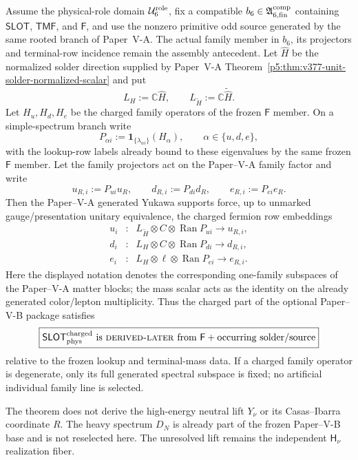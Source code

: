 \documentclass[12pt,a4paper]{article}
\newcommand{\Hnu}{\mathsf{H}_{\nu}}
\newcommand{\Urole}{\mathcal U_6^{\rm role}}
\newcommand{\Acompsix}{\mathfrak A_{6,{\rm fin}}^{\rm comp}}
\begin{document}
\begin{theorem}
\label{p7v2:thm:charged-slot-physical-later}
Assume the physical-role domain \(\Urole\), fix a compatible
\(b_6\in\Acompsix\) containing \(\mathsf{SLOT}\), \(\mathsf{TMF}\), and
\(\mathsf F\), and use the nonzero primitive odd source generated by the same rooted branch of Paper~V-A.  The actual family member in \(b_6\), its projectors and terminal-row incidence remain the assembly antecedent.  Let \(\widehat H\) be the normalized solder direction supplied by Paper~V-A Theorem~\ref{p5:thm:v377-unit-solder-normalized-scalar} and put
\[
 L_H:=\mathbb C\widehat H,
 \qquad
 L_{\widetilde H}:=\mathbb C\widetilde{\widehat H}.
\]
Let \(H_u,H_d,H_e\) be the charged family operators of the frozen
\(\mathsf F\) member.  On a simple-spectrum branch write
\[
 P_{\alpha i}
 :=\mathbf 1_{\{\lambda_{\alpha i}\}}(H_\alpha),
 \qquad \alpha\in\{u,d,e\},
\]
with the lookup-row labels already bound to these eigenvalues by the same
frozen \(\mathsf F\) member.  Let the family projectors act on the Paper--V-A
family factor and write
\[
 u_{R,i}:=P_{ui}u_R,\qquad
 d_{R,i}:=P_{di}d_R,\qquad
 e_{R,i}:=P_{ei}e_R.
\]
Then the Paper--V-A generated Yukawa supports force, up to unmarked
gauge/presentation unitary equivalence, the charged fermion row embeddings
\[
\begin{array}{rcl}
 u_i&:&
 L_{\widetilde H}\otimes C\otimes\operatorname{Ran}P_{ui}
 \longrightarrow u_{R,i},\\[2pt]
 d_i&:&
 L_H\otimes C\otimes\operatorname{Ran}P_{di}
 \longrightarrow d_{R,i},\\[2pt]
 e_i&:&
 L_H\otimes\ell\otimes\operatorname{Ran}P_{ei}
 \longrightarrow e_{R,i}.
\end{array}
\]
Here the displayed notation denotes the corresponding one-family subspaces of
the Paper--V-A matter blocks; the mass scalar acts as the identity on the
already generated color/lepton multiplicity.  Thus the charged part of the
optional Paper--V-B package satisfies
\[
 \boxed{
 \mathsf{SLOT}_{\rm phys}^{\rm charged}
 \text{ is \textsc{derived-later} from }
 \mathsf F+\text{occurring solder/source}
 }
\]
relative to the frozen lookup and terminal-mass data.  If a charged family
operator is degenerate, only its full generated spectral subspace is fixed;
no artificial individual family line is selected.

The theorem does not derive the high-energy neutral lift \(Y_\nu\) or its
Casas--Ibarra coordinate \(R\).  The heavy spectrum \(D_N\) is already part of
the frozen Paper--V-B base and is not reselected here.  The unresolved lift
remains the independent \(\Hnu\) realization fiber.
\end{theorem}
\end{document}
